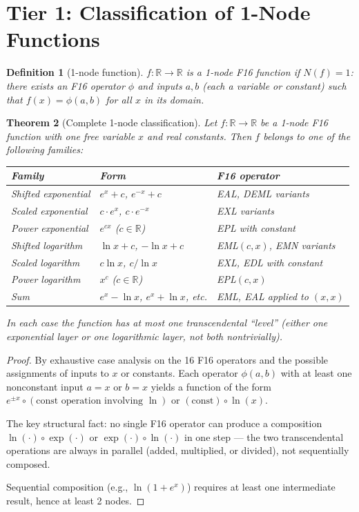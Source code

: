 \documentclass[11pt]{article}
\newtheorem{theorem}{Theorem}
\newtheorem{definition}[theorem]{Definition}
\begin{document}
\section{Tier 1: Classification of 1-Node Functions}

\begin{definition}[1-node function]
$f: \mathbb{R} \to \mathbb{R}$ is a \emph{1-node F16 function} if $N(f) = 1$:
there exists an F16 operator $\phi$ and inputs $a, b$ (each a variable or constant)
such that $f(x) = \phi(a, b)$ for all $x$ in its domain.
\end{definition}

\begin{theorem}[Complete 1-node classification]
\label{thm:1node}
Let $f: \mathbb{R} \to \mathbb{R}$ be a 1-node F16 function with one free
variable $x$ and real constants. Then $f$ belongs to one of the following families:

\begin{center}
\renewcommand{\arraystretch}{1.2}
\begin{tabular}{lll}
\toprule
Family & Form & F16 operator \\
\midrule
Shifted exponential & $e^x + c$, $e^{-x} + c$ & EAL, DEML variants \\
Scaled exponential & $c \cdot e^x$, $c \cdot e^{-x}$ & EXL variants \\
Power exponential & $e^{cx}$ ($c \in \mathbb{R}$) & EPL with constant \\
Shifted logarithm & $\ln x + c$, $-\ln x + c$ & EML$(c, x)$, EMN variants \\
Scaled logarithm & $c \ln x$, $c / \ln x$ & EXL, EDL with constant \\
Power logarithm & $x^c$ ($c \in \mathbb{R}$) & EPL$(c, x)$ \\
Sum & $e^x - \ln x$, $e^x + \ln x$, etc. & EML, EAL applied to $(x, x)$ \\
\bottomrule
\end{tabular}
\end{center}

\noindent In each case the function has at most one transcendental ``level''
(either one exponential layer or one logarithmic layer, not both nontrivially).
\end{theorem}

\begin{proof}
By exhaustive case analysis on the 16 F16 operators and the possible
assignments of inputs to $x$ or constants.
Each operator $\phi(a,b)$ with at least one nonconstant input $a = x$ or $b = x$
yields a function of the form $e^{\pm x} \circ (\text{const operation involving } \ln)$
or $(\text{const}) \circ \ln(x)$.

The key structural fact: no single F16 operator can produce a composition
$\ln(\cdot) \circ \exp(\cdot)$ or $\exp(\cdot) \circ \ln(\cdot)$ in one step —
the two transcendental operations are always in parallel (added, multiplied,
or divided), not sequentially composed.

Sequential composition (e.g., $\ln(1 + e^x)$) requires at least one intermediate
result, hence at least 2 nodes.
\end{proof}
\end{document}
